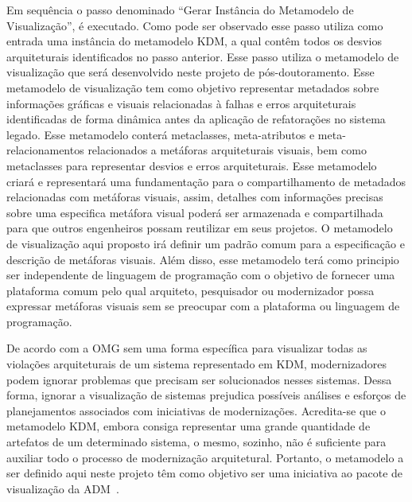 \documentclass[12pt]{article}
\begin{document}
Em sequência o passo denominado ``Gerar Instância do Metamodelo de Visualização'', é executado. Como pode ser observado esse passo utiliza como entrada uma instância do metamodelo KDM, a qual contêm todos os desvios arquiteturais identificados no passo anterior. Esse passo utiliza o metamodelo de visualização que será desenvolvido neste projeto de pós-doutoramento. Esse metamodelo de visualização tem como objetivo representar metadados sobre informações gráficas e visuais relacionadas à falhas e erros arquiteturais identificadas de forma dinâmica antes da aplicação de refatorações no sistema legado. Esse metamodelo conterá metaclasses, meta-atributos e meta-relacionamentos relacionados a metáforas arquiteturais visuais, bem como metaclasses para representar desvios e erros arquiteturais. Esse metamodelo criará e representará uma fundamentação para o compartilhamento de metadados relacionadas com metáforas visuais, assim, detalhes com informações precisas sobre uma especifica metáfora visual poderá ser armazenada e compartilhada para que outros engenheiros possam reutilizar em seus projetos. O metamodelo de visualização aqui proposto irá definir um padrão comum para a especificação e descrição de metáforas visuais. Além disso, esse metamodelo terá como principio ser independente de linguagem de programação com o objetivo de fornecer uma plataforma comum pelo qual arquiteto, pesquisador ou modernizador possa expressar metáforas visuais sem se preocupar com a plataforma ou linguagem de programação.

De acordo com a OMG sem uma forma específica para visualizar todas as violações arquiteturais de um sistema representado em KDM, modernizadores podem ignorar problemas que precisam ser solucionados nesses sistemas. Dessa forma, ignorar a visualização de sistemas prejudica possíveis análises e esforços de planejamentos associados com iniciativas de modernizações. Acredita-se que o metamodelo KDM, embora consiga representar uma grande quantidade de artefatos de um determinado sistema, o mesmo, sozinho, não é suficiente para auxiliar todo o processo de modernização arquitetural. Portanto, o metamodelo a ser definido aqui neste projeto têm como objetivo ser uma iniciativa ao pacote de visualização da ADM~\cite{ADM:visualization}.
\end{document}
